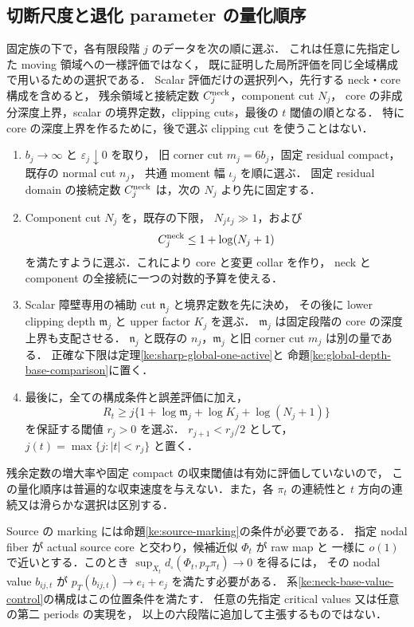 \subsection{切断尺度と退化 parameter の量化順序}
\label{ke:cut-selection-order}

固定族の下で，各有限段階 $j$ のデータを次の順に選ぶ．
これは任意に先指定した moving 領域への一様評価ではなく，
既に証明した局所評価を同じ全域構成で用いるための選択である．
Scalar 評価だけの選択列へ，先行する neck・core 構成を含めると，
残余領域と接続定数 $C_j^{\rm neck}$，component cut $N_j$，
core の非成分深度上界，scalar の境界定数，clipping cuts，最後の $t$ 閾値の順となる．
特に core の深度上界を作るために，後で選ぶ clipping cut を使うことはない．
\begin{enumerate}
\item $b_j\to\infty$ と $\varepsilon_j\downarrow0$ を取り，
旧 corner cut $m_j=6b_j$，固定 residual compact，既存の normal cut $n_j$，
共通 moment 幅 $\iota_j$ を順に選ぶ．
固定 residual domain の接続定数 $C_j^{\rm neck}$ は，次の $N_j$ より先に固定する．
\item Component cut $N_j$ を，既存の下限，
$N_j\iota_j\gg1$，および
\[
 C_j^{\rm neck}\le1+\log(N_j+1)
\]
を満たすように選ぶ．これにより core と変更 collar を作り，
neck と component の全接続に一つの対数的予算を使える．
\item Scalar 障壁専用の補助 cut $\mathfrak n_j$ と境界定数を先に決め，
その後に lower clipping depth $\mathfrak m_j$ と upper factor $K_j$ を選ぶ．
$\mathfrak m_j$ は固定段階の core の深度上界も支配させる．
$\mathfrak n_j$ と既存の $n_j$，$\mathfrak m_j$ と旧 corner cut $m_j$ は別の量である．
正確な下限は定理\ref{ke:sharp-global-one-active}と
命題\ref{ke:global-depth-base-comparison}に置く．
\item 最後に，全ての構成条件と誤差評価に加え，
\[
 R_t\ge j\{1+\log\mathfrak m_j+\log K_j+\log(N_j+1)\}
\]
を保証する閾値 $r_j>0$ を選ぶ．
$r_{j+1}<r_j/2$ として，$j(t)=\max\{j:|t|<r_j\}$ と置く．
\end{enumerate}
残余定数の増大率や固定 compact の収束閾値は有効に評価していないので，
この量化順序は普遍的な収束速度を与えない．また，各 $\pi_t$ の連続性と
$t$ 方向の連続又は滑らかな選択は区別する．

Source の marking には命題\ref{ke:source-marking}の条件が必要である．
指定 nodal fiber が actual source core と交わり，候補近似 $\Phi_t$ が raw map と
一様に $o(1)$ で近いとする．このとき
$\sup_{X_t}d_\square(\Phi_t,p_T\pi_t)\to0$ を得るには，
その nodal value $b_{ij,t}$ が $p_T(b_{ij,t})\to e_i+e_j$ を満たす必要がある．
系\ref{ke:neck-base-value-control}の構成はこの位置条件を満たす．
任意の先指定 critical values 又は任意の第二 periods の実現を，
以上の六段階に追加して主張するものではない．
